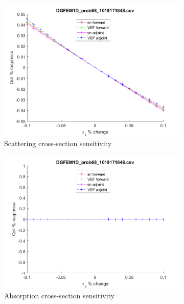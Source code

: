 \documentclass{article}
\begin{document}
\begin{figure}[H]
\begin{subfigure}{.5\textwidth}
  \includegraphics[width=.98\linewidth]{IanProposal/figures2/68sigsSens.png}
  \caption{Scattering cross-section sensitivity}
  \label{fig:sfig2}
\end{subfigure}%
\begin{subfigure}{.5\textwidth}
  \centering
  \includegraphics[width=.98\linewidth]{IanProposal/figures2/68sigaSens.png}
  \caption{Absorption cross-section sensitivity}
  \label{fig:sfig5}
\end{subfigure}%
\caption{}
\label{fig:fig}
\end{figure}
\newpage
\end{document}
